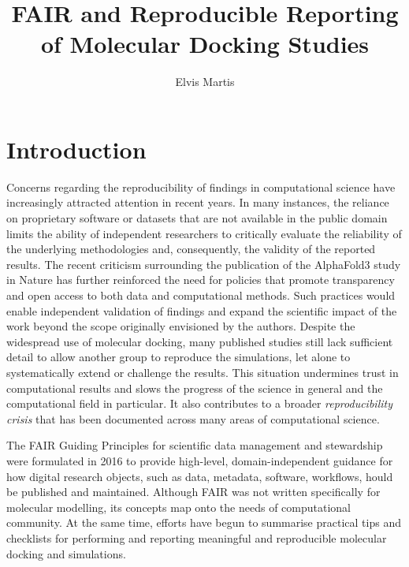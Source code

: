 \documentclass[12pt]{article}
\begin{document}
\title{FAIR and Reproducible Reporting of Molecular Docking Studies}
\author{Elvis Martis}
\date{}
\maketitle


\section{Introduction}
Concerns regarding the reproducibility of findings in computational science have increasingly attracted attention in recent years. In many instances, the reliance on proprietary software or datasets that are not available in the public domain limits the ability of independent researchers to critically evaluate the reliability of the underlying methodologies and, consequently, the validity of the reported results. The recent criticism surrounding the publication of the AlphaFold3\cite{CH12_AF3} study in Nature has further reinforced the need for policies that promote transparency and open access to both data and computational methods. Such practices would enable independent validation of findings and expand the scientific impact of the work beyond the scope originally envisioned by the authors\cite{ CH12_plos2025tenDocking}. Despite the widespread use of molecular docking, many published studies still lack sufficient detail to allow another group to reproduce the simulations, let alone to systematically extend or challenge the results. This situation undermines trust in computational results and slows the progress of the science in general and the computational field in particular. It also contributes to a broader \emph{reproducibility crisis} that has been documented across many areas of computational science.\cite{CH12_toolsRepro2016,CH12_reproWorkflows2017,CH12_barba2022role,CH12_rigorRepro2020}

The FAIR Guiding Principles for scientific data management and stewardship were formulated in 2016 to provide high-level, domain-independent guidance for how digital research objects, such as data, metadata, software, workflows, hould be published and maintained.\cite{CH12_wilkinson2016FAIR,CH12_goFairPrinciples,CH12_nnlmFAIR} Although FAIR was not written specifically for molecular modelling, its concepts map onto the needs of computational community.\cite{CH12_turingWayFAIR,CH12_healthFAIR2022} At the same time, efforts have begun to summarise practical tips and checklists for performing and reporting meaningful and reproducible molecular docking and simulations.\cite{CH12_plos2025tenDocking,CH12_mdChecklist2023,CH12_rigorRepro2020}
\end{document}
